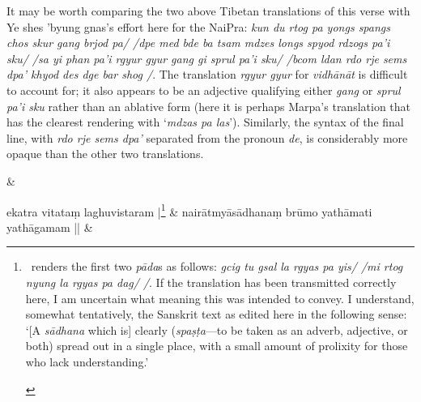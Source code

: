 \documentclass[naipra.tex]{subfiles}
\begin{document}
\begin{sanskrit}
{\begin{english}
	It may be worth comparing the two above Tibetan translations of this verse with Ye shes 'byung gnas's effort here for the NaiPra: \emph{kun du rtog pa yongs spangs chos skur gang brjod pa/ /dpe med bde ba tsam mdzes longs spyod rdzogs pa'i sku/ /sa yi phan pa'i rgyur gyur gang gi sprul pa'i sku/ /bcom ldan rdo rje sems dpa' khyod des dge bar shog /}. 
	The translation \emph{rgyur gyur} for \emph{vidhānāt} is difficult to account for; it also appears to be an adjective qualifying either \emph{gang} or \emph{sprul pa'i sku} rather than an ablative form (here it is perhaps Marpa's translation that has the clearest rendering with `\emph{mdzas pa las}').
	Similarly, the syntax of the final line, with \emph{rdo rje sems dpa'} separated from the pronoun \emph{de}, is considerably more opaque than the other two translations.
\end{english}} \&



\medskip\versequote
ekatra vitataṃ laghuvistaram |\footnote{\begin{english}
	\TIB\ renders the first two \emph{pāda}s as follows: \emph{gcig tu gsal la rgyas pa yis/ /mi rtog nyung la rgyas pa dag/ /}.
	If the translation has been transmitted correctly here, I am uncertain what meaning this was intended to convey. 
	I understand, somewhat tentatively, the Sanskrit text as edited here in the following sense: `[A \emph{sādhana} which is] clearly (\emph{spaṣṭa}—to be taken as an adverb, adjective, or both) spread out in a single place, with a small amount of prolixity for those who lack understanding.'
\end{english}} & 
nairātmyāsādhanaṃ brūmo yathāmati yathāgamam || \&



\end{sanskrit}
\end{document}
